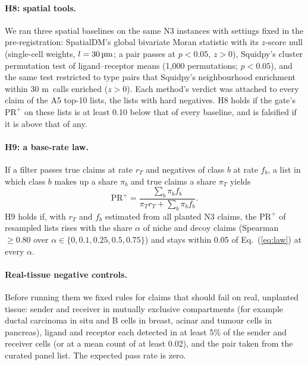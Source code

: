\documentclass[letterpaper]{article} %
\newcommand{\um}{\ifmmode\,\text{\textmu m}\else\,\textmu m\fi}
\begin{document}
\paragraph{H8: spatial tools.} We ran three spatial baselines on the same N3 instances with settings fixed in the
pre-registration: SpatialDM's global bivariate Moran statistic with its $z$-score null (single-cell weights,
$l=30\um$; a pair passes at $p<0.05$, $z>0$), Squidpy's cluster permutation test of ligand--receptor means (1,000
permutations; $p<0.05$), and the same test restricted to type pairs that Squidpy's neighbourhood enrichment within
30\um\ calls enriched ($z>0$). Each method's verdict was attached to every claim of the A5 top-10 lists, the lists
with hard negatives. H8 holds if the gate's $\mathrm{PR}^{+}$ on these lists is at least 0.10 below that of every
baseline, and is falsified if it is above that of any.

\paragraph{H9: a base-rate law.} If a filter passes true claims at rate $r_T$ and negatives of class $b$ at rate
$f_b$, a list in which class $b$ makes up a share $\pi_b$ and true claims a share $\pi_T$ yields
\begin{equation}
\mathrm{PR}^{+}=\frac{\sum_b\pi_b f_b}{\pi_T r_T+\sum_b\pi_b f_b}.
\label{eq:law}
\end{equation}
H9 holds if, with $r_T$ and $f_b$ estimated from all planted N3 claims, the $\mathrm{PR}^{+}$ of resampled lists rises
with the share $\alpha$ of niche and decoy claims (Spearman $\geq0.80$ over $\alpha\in\{0,0.1,0.25,0.5,0.75\}$) and stays
within 0.05 of Eq.~(\ref{eq:law}) at every $\alpha$.

\paragraph{Real-tissue negative controls.} Before running them we fixed rules for claims that should fail on real,
unplanted tissue: sender and receiver in mutually exclusive compartments (for example ductal carcinoma in situ and B
cells in breast, acinar and tumour cells in pancreas), ligand and receptor each detected in at least 5\% of the sender
and receiver cells (or at a mean count of at least 0.02), and the pair taken from the curated panel list. The expected
pass rate is zero.
\end{document}
